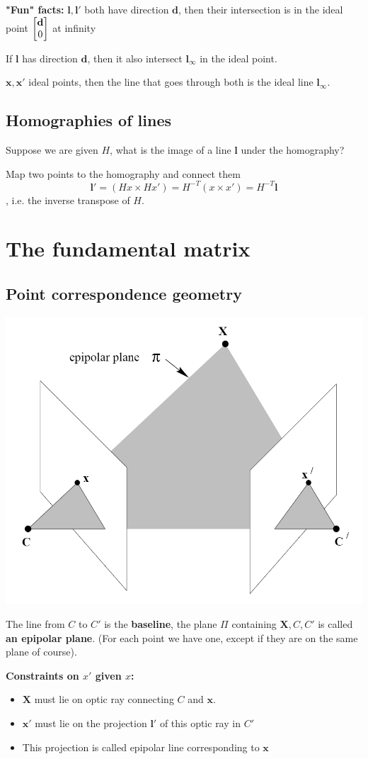 \textbf{"Fun" facts:} $\mathbf{l, l'}$ both have direction $\mathbf{d}$, then their intersection is in the ideal point $\left[\begin{matrix}\mathbf{d} \\ 0\end{matrix}\right]$ at infinity

If $\mathbf{l}$ has direction $\mathbf{d}$, then it also intersect $\mathbf{l}_\infty$ in the ideal point.

$\mathbf{x, x'}$ ideal points, then the line that goes through both is the ideal line $\mathbf{l}_\infty$.

\subsection{Homographies of lines}

Suppose we are given $H$, what is the image of a line $\mathbf{l}$ under the homography?

Map two points to the homography and connect them $$\mathbf{l'} = (Hx \times Hx') = H^{-T} (x \times x') = H^{-T} \mathbf{l}$$, i.e. the inverse transpose of $H$.

\section{The fundamental matrix}

\subsection{Point correspondence geometry}

\includegraphics[width=.5\textwidth]{images/chap8/point_correspondence_geometry}

The line from $C$ to $C'$ is the \textbf{baseline}, the plane $\Pi$ containing $\mathbf{X}, C, C'$ is called \textbf{an epipolar plane}. (For each point we have one, except if they are on the same plane of course).

\textbf{Constraints on $x'$ given $x$:} \begin{itemize}
    \item $\mathbf{X}$ must lie on optic ray connecting $C$ and $\mathbf{x}$.
    \item $\mathbf{x'}$ must lie on the projection $\mathbf{l}'$ of this optic ray in $C'$
    \item This projection is called epipolar line corresponding to $\mathbf{x}$
\end{itemize}

